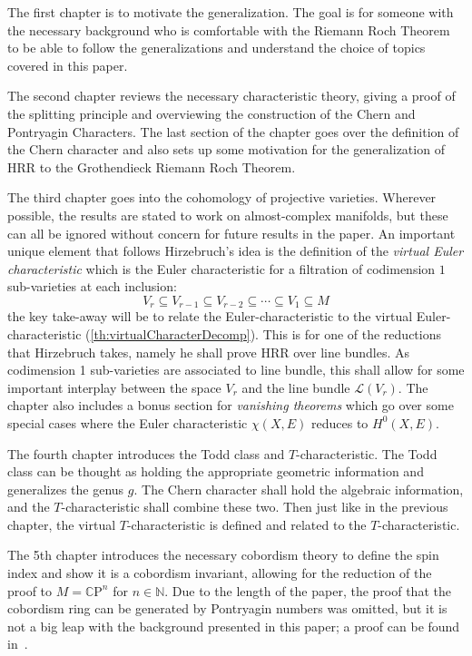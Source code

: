 \documentclass{book}
\newcommand{\N}{{\mathbb{N}}}
\newcommand{\CL}{{\mathcal{L}}}
\newcommand{\CP}{{\mathbb{C}\mathrm{P}}}
\newcommand{\sse}{\subseteq}
\begin{document}
The first chapter is to motivate the generalization. The goal is for someone with the necessary background
who is comfortable with the Riemann Roch Theorem to be able to follow the generalizations and understand the
choice of topics covered in this paper.

The second chapter reviews the necessary characteristic theory, giving a proof of the splitting
principle and overviewing the construction of the Chern and Pontryagin Characters. The last section of the
chapter goes over the definition of the Chern character and also sets up some motivation for the
generalization of HRR to the Grothendieck Riemann Roch Theorem.

The third chapter goes into the cohomology of projective varieties. Wherever possible, the results are stated
to work on almost-complex manifolds, but these can all be ignored without concern for future results in the
paper. An important unique element that follows Hirzebruch's idea is the definition of the \emph{virtual Euler
characteristic} which is the Euler characteristic for a filtration of codimension $1$ sub-varieties at each
inclusion:
\[
  V_r \sse V_{r-1} \sse V_{r-2} \sse \cdots \sse V_1 \sse M
\]
the key take-away will be to relate the Euler-characteristic to the virtual Euler-characteristic
(\cref{th:virtualCharacterDecomp}). This is for one of the reductions that Hirzebruch takes, namely he shall
prove HRR over line bundles. As codimension 1 sub-varieties are associated to line bundle, this shall allow
for some important interplay between the space $V_r$ and the line bundle $\CL(V_r)$. The chapter also includes
a bonus section for \emph{vanishing theorems} which go over some special cases where the Euler characteristic
$\chi(X,E)$ reduces to $H^0(X, E)$.

The fourth chapter introduces the Todd class and $T$-characteristic. The Todd class can be thought as holding
the appropriate geometric information and generalizes the genus $g$. The Chern character shall hold the
algebraic information, and the $T$-characteristic shall combine these two. Then just like in the
previous chapter, the virtual $T$-characteristic is defined and related to the $T$-characteristic.

The 5th chapter introduces the necessary cobordism theory to define the spin index and show it is a cobordism
invariant, allowing for the reduction of the proof to $M = \CP^n$ for $n \in\N$. Due to the length of the
paper, the proof that the cobordism ring can be generated by Pontryagin numbers was omitted, but it is not
a big leap with the background presented in this paper; a proof can be found
in~\cite{hirzebruchTopologicalMethodsAlgebraic1995}.
\end{document}

